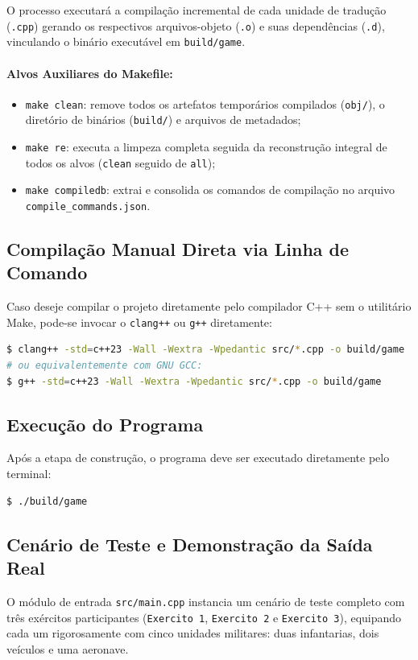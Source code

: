 \documentclass[12pt,a4paper]{article}
\begin{document}
O processo executará a compilação incremental de cada unidade de tradução (\texttt{.cpp}) gerando os respectivos arquivos-objeto (\texttt{.o}) e suas dependências (\texttt{.d}), vinculando o binário executável em \texttt{build/game}.

\paragraph{Alvos Auxiliares do Makefile:}
\begin{itemize}
    \item \texttt{make clean}: remove todos os artefatos temporários compilados (\texttt{obj/}), o diretório de binários (\texttt{build/}) e arquivos de metadados;
    \item \texttt{make re}: executa a limpeza completa seguida da reconstrução integral de todos os alvos (\texttt{clean} seguido de \texttt{all});
    \item \texttt{make compiledb}: extrai e consolida os comandos de compilação no arquivo \texttt{compile\_}\allowbreak\texttt{commands.json}.
\end{itemize}

\subsection{Compilação Manual Direta via Linha de Comando}
Caso deseje compilar o projeto diretamente pelo compilador C++ sem o utilitário Make, pode-se invocar o \texttt{clang++} ou \texttt{g++} diretamente:
\begin{lstlisting}[language=bash, numbers=none, caption={Compilação manual direta com Clang++ ou G++.}]
$ clang++ -std=c++23 -Wall -Wextra -Wpedantic src/*.cpp -o build/game
# ou equivalentemente com GNU GCC:
$ g++ -std=c++23 -Wall -Wextra -Wpedantic src/*.cpp -o build/game
\end{lstlisting}

\subsection{Execução do Programa}
Após a etapa de construção, o programa deve ser executado diretamente pelo terminal:
\begin{lstlisting}[language=bash, numbers=none, caption={Execução do binário compilado.}]
$ ./build/game
\end{lstlisting}

\subsection{Cenário de Teste e Demonstração da Saída Real}
O módulo de entrada \texttt{src/main.cpp} instancia um cenário de teste completo com três exércitos participantes (\texttt{Exercito 1}, \texttt{Exercito 2} e \texttt{Exercito 3}), equipando cada um rigorosamente com cinco unidades militares: duas infantarias, dois veículos e uma aeronave.
\end{document}
